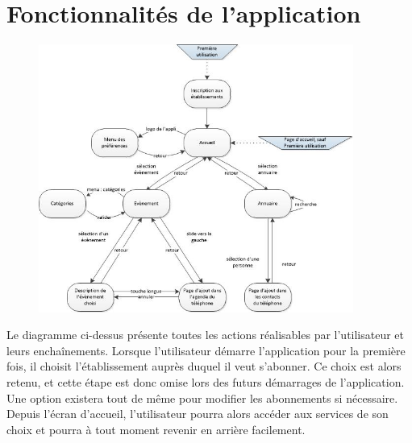 \documentclass [pdftex,12pt] {report}
\begin{document}
\section{Fonctionnalités de l'application}

\begin{figure}[h]
  \center
  \includegraphics[width=0.92\textwidth]{resources/features1.jpg}
\end{figure}

\newpage

Le diagramme ci-dessus présente toutes les actions réalisables par l'utilisateur et leurs enchaînements.
Lorsque l'utilisateur démarre l'application pour la première fois, il choisit l'établissement auprès duquel il veut s'abonner.
Ce choix est alors retenu, et cette étape est donc omise lors des futurs démarrages de l'application. Une option existera tout de même pour modifier les abonnements si nécessaire. Depuis l'écran d'accueil, l'utilisateur pourra alors accéder aux services de son choix et pourra à tout moment revenir en arrière facilement. \\
\end{document}
